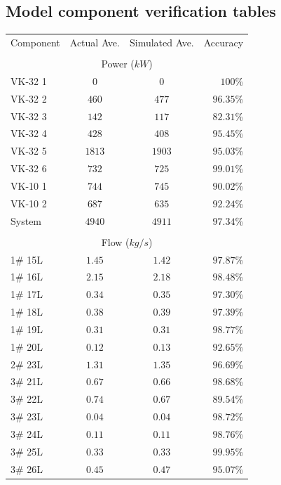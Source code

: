 \begin{appendices}
\chapter{Model component verification tables}
\newpage
\begin{table}[h!]
	\centering
	\begin{tabular}{lccr}
		\hline 
		Component & Actual Ave. & Simulated  Ave. & Accuracy \\ \hhline{====} 
		\\
		\multicolumn{4}{c}{Power ($ kW $)}
		\\
		VK-32 1 & $  0  $ & $  0  $ & $ 100   $\% \\
		VK-32 2 & $ 460 $ & $ 477 $ & $ 96.35 $\% \\
		VK-32 3 & $ 142 $ & $ 117 $ & $ 82.31 $\% \\
		VK-32 4 & $ 428 $ & $ 408 $ & $ 95.45 $\% \\
		VK-32 5 & $ 1813$ & $ 1903$ & $ 95.03 $\% \\
		VK-32 6 & $ 732 $ & $ 725 $ & $ 99.01 $\% \\
		VK-10 1 & $ 744 $ & $ 745 $ & $ 90.02 $\% \\
		VK-10 2 & $ 687 $ & $ 635 $ & $ 92.24 $\% \\
		System  & $ 4940$ & $4911 $ & $ 97.34 $\% \\
		\\
		\multicolumn{4}{c}{Flow ($ kg/s $)}
		\\
		1\# 15L  & $ 1.45 $ & $ 1.42 $ & $ 97.87 $\% \\
		1\# 16L  & $ 2.15 $ & $ 2.18 $ & $ 98.48 $\% \\
		1\# 17L  & $ 0.34 $ & $ 0.35 $ & $ 97.30 $\% \\
		1\# 18L  & $ 0.38 $ & $ 0.39 $ & $ 97.39 $\% \\
		1\# 19L  & $ 0.31 $ & $ 0.31 $ & $ 98.77 $\% \\
		1\# 20L  & $ 0.12 $ & $ 0.13 $ & $ 92.65 $\% \\
		2\# 23L  & $ 1.31 $ & $ 1.35 $ & $ 96.69 $\% \\
		3\# 21L  & $ 0.67 $ & $ 0.66 $ & $ 98.68 $\% \\
		3\# 22L  & $ 0.74 $ & $ 0.67 $ & $ 89.54 $\% \\
		3\# 23L  & $ 0.04 $ & $ 0.04 $ & $ 98.72 $\% \\
		3\# 24L  & $ 0.11 $ & $ 0.11 $ & $ 98.76 $\% \\
		3\# 25L  & $ 0.33 $ & $ 0.33 $ & $ 99.95 $\% \\
		3\# 26L  & $ 0.45 $ & $ 0.47 $ & $ 95.07 $\% \\

\end{tabular}
\end{table}
\end{appendices}
